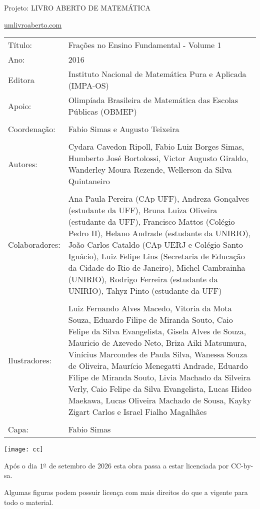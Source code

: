 \documentclass[a4paper,10pt]{article}
\begin{document}
\thispagestyle{empty}

\vspace{2cm}
\begin{center}
Projeto: LIVRO ABERTO DE MATEMÁTICA

\url{umlivroaberto.com}
\vspace{2cm}

\begin{tabular}{p{}p{}}
Título: & Frações no Ensino Fundamental - Volume 1\\
Ano: & 2016 \\
Editora & Instituto Nacional de Matem\'atica Pura e Aplicada (IMPA-OS)\\
Apoio:& Olimp\'iada Brasileira de Matem\'atica das Escolas P\'ublicas (OBMEP)\\
\\
Coordenação: & Fabio Simas e Augusto Teixeira\\
\\
Autores: & Cydara Cavedon Ripoll, Fabio Luiz Borges Simas, Humberto José Bortolossi, Victor Augusto Giraldo, Wanderley Moura Rezende, Wellerson  da Silva Quintaneiro\\
\\
Colaboradores: & Ana Paula Pereira (CAp UFF), Andreza Gonçalves (estudante da UFF), Bruna Luiza Oliveira (estudante da UFF), Francisco Mattos (Colégio Pedro II), Helano Andrade (estudante da UNIRIO), João Carlos Cataldo (CAp UERJ e Colégio Santo Ignácio), Luiz Felipe Lins (Secretaria de Educação da Cidade do Rio de Janeiro), Michel Cambrainha (UNIRIO), Rodrigo Ferreira (estudante da UNIRIO), Tahyz Pinto (estudante da UFF) \\
\\
Ilustradores: & Luiz Fernando Alves Macedo,
Vitoria da Mota Souza,
Eduardo Filipe de Miranda Souto,
Caio Felipe da Silva Evangelista,
Gisela Alves de Souza,
Mauricio de Azevedo Neto,
Briza Aiki Matsumura,
Vinícius Marcondes de Paula Silva,
Wanessa Souza de Oliveira,
Maurício Menegatti Andrade,
Eduardo Filipe de Miranda Souto,
Livia Machado da Silveira Verly,
Caio Felipe da Silva Evangelista,
Lucas Hideo Maekawa,
Lucas Oliveira Machado de Sousa,
Kayky Zigart Carlos e
Israel Fialho Magalhães\\
\\
Capa: & Fabio Simas
\end{tabular}
\vspace{5cm}
 
\texttt{[image: cc]}

Após o dia $1^{\textrm{\underline{o}}}$ de setembro de 2026 esta obra passa a estar licenciada por CC-by-sa.

Algumas figuras podem possuir licença com mais direitos do que a vigente para todo o material.
\end{center}
\pagebreak
\end{document}
